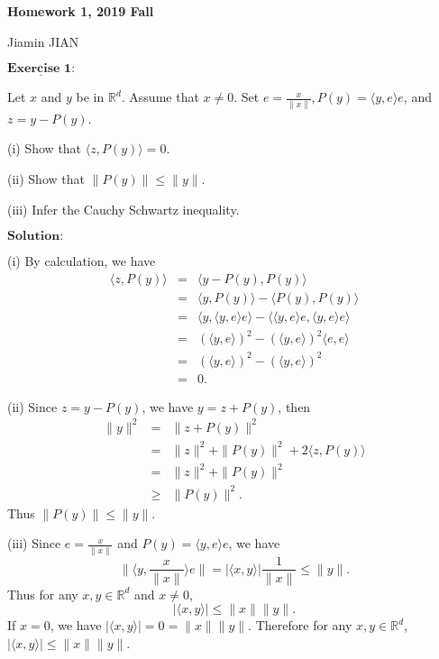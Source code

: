 \documentclass[12pt,a4paper]{ctexart}
\begin{document}
\begin{center}
\textbf{ Homework 1, 2019 Fall}
\vspace{8pt}

Jiamin JIAN
\end{center}

\vspace{12pt}

$\underline{\textbf{Exercise 1:}}$

Let $x$ and $y$ be in $\mathbb R^d$. Assume that $x \neq 0$. Set $e = \frac{x}{\|x\|}, P(y) = \langle y, e \rangle e$, and $z = y - P(y)$.

(i) Show that $ \langle z, P(y) \rangle = 0$.

(ii) Show that $\|P(y)\| \leq \|y\|$.

(iii) Infer the Cauchy Schwartz inequality.
 
\vspace{8pt}
$\textbf{Solution:}$

(i) By calculation, we have
\begin{eqnarray*}
    \langle z, P(y) \rangle  & = & \langle y - P(y), P(y) \rangle \\
    & = & \langle y, P(y) \rangle - \langle P(y) , P(y) \rangle \\
    & = & \langle y, \langle y, e \rangle e \rangle - \langle \langle y, e \rangle e , \langle y, e \rangle e \rangle \\
    & = & (\langle y, e \rangle)^2 - (\langle y, e \rangle)^2 \langle e, e \rangle \\
    & = & (\langle y, e \rangle)^2 - (\langle y, e \rangle)^2 \\
    & = & 0.
\end{eqnarray*}

(ii) Since $z = y - P(y)$, we have $y = z + P(y)$, then
\begin{eqnarray*}
    \|y\|^2 & = & \|z + P(y)\|^2 \\
    & = & \|z\|^2 + \|P(y)\|^2 + 2 \langle z, P(y) \rangle \\
    & = & \|z\|^2 + \|P(y)\|^2 \\
    & \geq & \|P(y)\|^2.
\end{eqnarray*}
Thus $\|P(y)\| \leq \|y\|$.

\vspace{6pt} 

(iii) Since $e = \frac{x}{\|x\|}$ and $P(y) = \langle y, e \rangle e$, we have 
$$\| \langle y, \frac{x}{\|x\|} \rangle  e \| = |\langle x, y \rangle| \frac{1}{\|x\|} \leq \|y\|.$$
Thus for any $x, y \in \mathbb R^d$ and $x \neq 0$,
$$|\langle x, y \rangle| \leq \|x\| \|y\|.$$
If $x = 0$, we have $|\langle x, y \rangle| = 0 = \|x\| \|y\|$. Therefore for any $x, y \in \mathbb R^d$, $|\langle x, y \rangle| \leq \|x\| \|y\|$.
\end{document}
